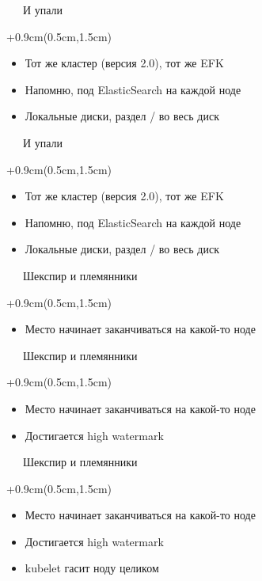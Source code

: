 \documentclass[xetex,18pt,aspectratio=43]{beamer}
\begin{document}
\begin{Large}
\begin{frame}{\ \ \ И упали}
\begin{textblock*}{\framewidth+0.9cm}(0.5cm,1.5cm)
\begin{itemize}
  \item Тот же кластер (версия 2.0), тот же EFK
  \item Напомню, под ElasticSearch на каждой ноде
  \item Локальные диски, раздел / во весь диск
\end{itemize}
\end{textblock*}
\end{frame}

\begin{frame}{\ \ \ И упали}
\begin{textblock*}{\framewidth+0.9cm}(0.5cm,1.5cm)
\begin{itemize}
  \item Тот же кластер (версия 2.0), тот же EFK
  \item Напомню, под ElasticSearch на каждой ноде
  \item Локальные диски, раздел / во весь диск
\end{itemize}
\end{textblock*}
\end{frame}

\begin{frame}{\ \ \ Шекспир и племянники}
\begin{textblock*}{\framewidth+0.9cm}(0.5cm,1.5cm)
\begin{itemize}
  \item Место начинает заканчиваться на какой-то ноде
\end{itemize}
\end{textblock*}
\end{frame}

\begin{frame}{\ \ \ Шекспир и племянники}
\begin{textblock*}{\framewidth+0.9cm}(0.5cm,1.5cm)
\begin{itemize}
  \item Место начинает заканчиваться на какой-то ноде
  \item Достигается high watermark
\end{itemize}
\end{textblock*}
\end{frame}

\begin{frame}{\ \ \ Шекспир и племянники}
\begin{textblock*}{\framewidth+0.9cm}(0.5cm,1.5cm)
\begin{itemize}
  \item Место начинает заканчиваться на какой-то ноде
  \item Достигается high watermark
  \item kubelet гасит ноду целиком
\end{itemize}
\end{textblock*}
\end{frame}


\end{Large}
\end{document}
